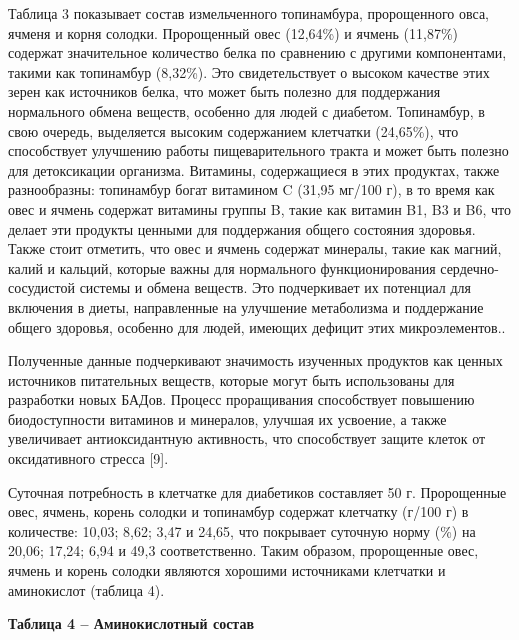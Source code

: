 \begin{multicols}{2}
Таблица 3 показывает состав измельченного топинамбура, пророщенного
овса, ячменя и корня солодки. Пророщенный овес (12,64\%) и ячмень
(11,87\%) содержат значительное количество белка по сравнению с другими
компонентами, такими как топинамбур (8,32\%). Это свидетельствует о
высоком качестве этих зерен как источников белка, что может быть полезно
для поддержания нормального обмена веществ, особенно для людей с
диабетом. Топинамбур, в свою очередь, выделяется высоким содержанием
клетчатки (24,65\%), что способствует улучшению работы пищеварительного
тракта и может быть полезно для детоксикации организма. Витамины,
содержащиеся в этих продуктах, также разнообразны: топинамбур богат
витамином C (31,95 мг/100 г), в то время как овес и ячмень содержат
витамины группы B, такие как витамин B1, B3 и B6, что делает эти
продукты ценными для поддержания общего состояния здоровья. Также стоит
отметить, что овес и ячмень содержат минералы, такие как магний, калий и
кальций, которые важны для нормального функционирования
сердечно-сосудистой системы и обмена веществ. Это подчеркивает их
потенциал для включения в диеты, направленные на улучшение метаболизма и
поддержание общего здоровья, особенно для людей, имеющих дефицит этих
микроэлементов..

Полученные данные подчеркивают значимость изученных продуктов как ценных
источников питательных веществ, которые могут быть использованы для
разработки новых БАДов. Процесс проращивания способствует повышению
биодоступности витаминов и минералов, улучшая их усвоение, а также
увеличивает антиоксидантную активность, что способствует защите клеток
от оксидативного стресса {[}9{]}.

Суточная потребность в клетчатке для диабетиков составляет 50 г.
Пророщенные овес, ячмень, корень солодки и топинамбур содержат клетчатку
(г/100 г) в количестве: 10,03; 8,62; 3,47 и 24,65, что покрывает
суточную норму (\%) на 20,06; 17,24; 6,94 и 49,3 соответственно. Таким
образом, пророщенные овес, ячмень и корень солодки являются хорошими
источниками клетчатки и аминокислот (таблица 4).
\end{multicols}

{\bfseries Таблица 4 -- Аминокислотный состав}

